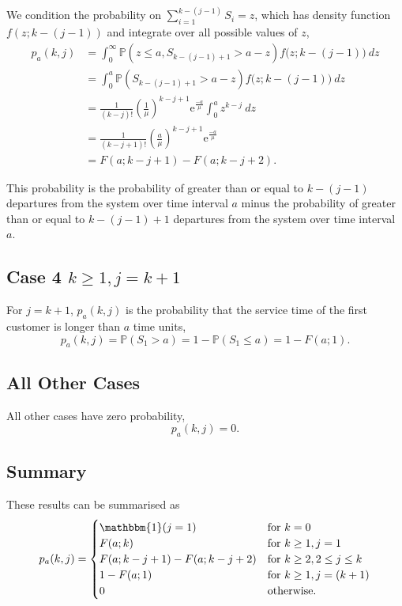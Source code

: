 We condition the probability on $\sum_{i = 1}^{k - (j - 1)} S_{i} = z$, which has density function $f (z; k - (j - 1))$ and integrate over all possible values of $z$,
\begin{equation}
	\begin{split}
		p_{a} (k, j)
		& = \int_{0}^{\infty} \mathbb{P} (z \leq a, S_{k - (j - 1) + 1} > a - z) f \big( z; k - (j - 1) \big) \ d z \\
		& = \int_{0}^{a} \mathbb{P} (S_{k - (j - 1) + 1} > a - z) f \big( z; k - (j - 1) \big) \ d z \\
		& = \frac{1}{(k - j)!} \left( \frac{1}{\mu} \right)^{k - j + 1} \mathrm{e}^{\frac{- a}{\mu}} \int_{0}^{a} z^{k - j} \ d z \\
		& = \frac{1}{(k - j + 1)!} \left( \frac{a}{\mu} \right)^{k - j + 1} \mathrm{e}^{\frac{- a}{\mu}} \\
		& = F (a; k - j + 1) - F (a; k - j + 2).
	\end{split}
\end{equation}

This probability is the probability of greater than or equal to $k - (j - 1)$ departures from the system over time interval $a$ minus the probability of greater than or equal to $k - (j - 1) + 1$ departures from the system over time interval $a$.

\subsection{Case 4 $k \geq 1, j = k + 1$}
For $j = k + 1$, $p_{a} (k, j)$ is the probability that the service time of the first customer is longer than $a$ time units,
\begin{equation}
	p_{a} (k, j) = \mathbb{P} (S_{1} > a) = 1 - \mathbb{P} (S_{1} \leq a) = 1 - F (a; 1).
\end{equation}

\subsection{All Other Cases}
All other cases have zero probability,
\begin{equation}
	p_{a} (k, j) = 0.
\end{equation}

\subsection{Summary}
These results can be summarised as
\begin{equation}
	p_{a} (k, j) = \begin{cases}
		\mathbbm{1} (j = 1) & \text{for $k = 0$} \\
		F (a; k) & \text{for $k \geq 1, j = 1$} \\
		F (a; k - j + 1) - F (a; k - j + 2) & \text{for $k \geq 2, 2 \leq j \leq k$} \\
		1 - F (a; 1) & \text{for $k \geq 1, j = (k + 1)$} \\
		0 & \text{otherwise}.
	\end{cases}
\end{equation}

